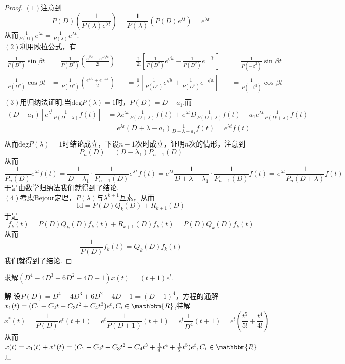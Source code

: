 \documentclass{ctexart}
\newenvironment{custom}[1]{\par\noindent \textbf{#1}\quad}{\par\vspace{1em}}
\begin{document}
\begin{proof}
$(1)$注意到
$$P(D)\left(\frac{1}{P(\lambda)e^{\lambda t}}\right)=\frac{1}{P(\lambda)}\left(P(D)e^{\lambda t}\right)=e^{\lambda t}$$
从而$\frac{1}{P(D)}e^{\lambda t}=\frac{1}{P(\lambda)}e^{\lambda t}$.\\
$(2)$利用欧拉公式，有
$$\begin{aligned}\frac{1}{P(D^{2})}\sin{\beta t}&=\frac{1}{P(D^{2})}\left(\frac{e^{\mathrm{i\beta t}}-e^{-\mathrm{i}\beta t}}{2\mathrm{i}}\right)&&=\frac{1}{2\mathrm{i}}\left[\frac{1}{P(D^{2})}e^{\mathrm{i}\beta t}-\frac{1}{P(D^{2})}e^{-\mathrm{i\beta t}}\right]&&=\frac{1}{P(-\beta^{2})}\sin{\beta t}\\\frac{1}{P(D^{2})}\cos{\beta t}&=\frac{1}{P(D^{2})}\left(\frac{e^{\mathrm{i\beta t}}+e^{-\mathrm{i}\beta t}}{2}\right)&&=\frac{1}{2}\left[\frac{1}{P(D^{2})}e^{\mathrm{i}\beta t}+\frac{1}{P(D^{2})}e^{-\mathrm{i\beta t}}\right]&&=\frac{1}{P(-\beta^{2})}\cos{\beta t}\\\end{aligned}$$
$(3)$用归纳法证明.当$\mathrm{deg}P(\lambda)=1$时，$P(D)=D-a_{1}$,而
$$\begin{aligned}(D-a_{1})\left[e^{\lambda^{t}}\frac{1}{P(D+\lambda)}f(t)\right]&=\lambda e^{\lambda t}\frac{1}{P(D+\lambda)}f(t)+e^{\lambda t}D\frac{1}{P(D+\lambda)}f(t)-a_{1}e^{\lambda t}\frac{1}{P(D+\lambda)}f(t)\\&=e^{\lambda t}(D+\lambda-a_{1})\frac{1}{D+\lambda-a_{1}}f(t)=e^{\lambda t}f(t)\\\end{aligned}$$
从而$\mathrm{deg}P(\lambda)=1$时结论成立，下设$n-1$次时成立，证明$n$次的情形，注意到
$$P_{n}(D)=(D-\lambda_{1})P_{n-1}(D)$$
从而
$$\frac{1}{P_{n}(D)}e^{\lambda t}f(t)=\frac{1}{D-\lambda_{1}}\cdot \frac{1}{P_{n-1}(D)}e^{\lambda t}f(t)=e^{\lambda t}\frac{1}{D+\lambda-\lambda_{1}}\cdot\frac{1}{P_{n-1}(D)}f(t)=e^{\lambda t}\frac{1}{P_{n}(D+\lambda)}f(t)$$
于是由数学归纳法我们就得到了结论.\\
$(4)$考虑$\mathrm{Bejour}$定理，$P(\lambda)$与$\lambda^{k+1}$互素，从而
$$\mathrm{Id}=P(D)Q_{k}(D)+R_{k+1}(D)$$
于是
$$f_{k}(t)=P(D)Q_{k}(D)f_{k}(t)+R_{k+1}(D)f_{k}(t)=P(D)Q_{k}(D)f_{k}(t)$$
从而
$$\frac{1}{P(D)}f_{k}(t)=Q_{k}(D)f_{k}(t)$$
我们就得到了结论.
\end{proof}

\begin{example}
求解$(D^{4}-4D^{3}+6D^{2}-4D+1)x(t)=(t+1)e^{t}$.
\end{example}

\begin{custom}{解}
设$P(D)=D^{4}-4D^{3}+6D^{2}-4D+1=(D-1)^{4}$，方程的通解$x_{1}(t)=(C_{1}+C_{2}t+C_{3}t^{2}+C_{4}t^{3})e^{t},C_{i}\in\mathbbm{R}$,特解
$$x^{*}(t)=\frac{1}{P(D)}e^{t}(t+1)=e^{t}\frac{1}{P(D+1)}(t+1)=e^{t}\frac{1}{D^{4}}(t+1)=e^{t}\left(\frac{t^{5}}{5!}+\frac{t^{4}}{4!}\right)$$
从而$x(t)=x_{1}(t)+x^{*}(t)=(C_{1}+C_{2}t+C_{3}t^{2}+C_{4}t^{3}+\frac{1}{4!}t^{4}+\frac{1}{5!}t^{5})e^{t},C_{i}\in\mathbbm{R}$.$\hfill{\square}$
\end{custom}
\end{document}
